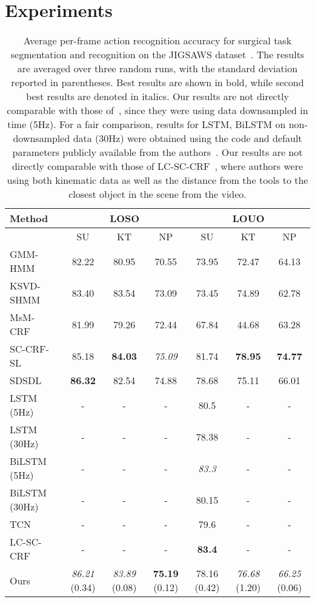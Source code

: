 \documentclass[10pt,twocolumn,letterpaper]{article}
\begin{document}
\section{Experiments}
\begin{table*}[ht!]
\setlength{\tabcolsep}{0.75mm}
\centering
\begin{tabular}{|@{\;}l@{\;}|ccc|ccc|}
\hline
Method & \multicolumn{3}{|c|}{LOSO} & \multicolumn{3}{|c|}{LOUO} \\
\hline
 & SU & KT & NP & SU & KT & NP\\
\hline
GMM-HMM~\cite{Ahmidi:TBME17}  &82.22  & 80.95  & 70.55 &  73.95  & 72.47  & 64.13 \\
KSVD-SHMM~\cite{Tao:IPCAI12,Ahmidi:TBME17} & 83.40 & 83.54  & 73.09  & 73.45  & 74.89   & 62.78  \\
MsM-CRF~\cite{Tao:MICCAI13,Ahmidi:TBME17} & 81.99  & 79.26  & 72.44  & 67.84   & 44.68  & 63.28 \\
SC-CRF-SL~\cite{Lea:WACV15,Ahmidi:TBME17} & 85.18 & \textbf{84.03} & \emph{75.09} & 81.74 & \textbf{78.95} & \textbf{74.77} \\
SDSDL~\cite{Sefati:M2CAI15} & \textbf{86.32} & 82.54 & 74.88 & 78.68 & 75.11 & 66.01 \\
LSTM (5Hz)~\cite{Dipietro:MICCAI16}\text{*} & -      & -     & -      & 
80.5 & -      & - \\
LSTM (30Hz)~\cite{Dipietro:MICCAI16}\text{*} & -      & -     & -      & 
78.38 & -      & - \\
BiLSTM (5Hz)~\cite{Dipietro:MICCAI16}\text{*} & -      & -     & -      & 
\emph{83.3} & -      & - \\
BiLSTM (30Hz) ~\cite{Dipietro:MICCAI16}\text{*} & -      & -     & -      & 
80.15 & -      & - \\
TCN~\cite{Lea:ECCV16-WBNIMR} & -      & -     & -      & 
79.6 & -      & - \\
LC-SC-CRF~\cite{Lea:ICRA16}\text{**} & -      & -     & -      & 
\textbf{83.4} & -      & - \\
Ours & \emph{86.21} (0.34) & \emph{83.89} (0.08) & \textbf{75.19} (0.12) & 78.16 (0.42) &\emph{76.68} (1.20) & \emph{66.25} (0.06)\\
\hline
\end{tabular}
\caption{Average per-frame action recognition accuracy for surgical task segmentation and recognition on the JIGSAWS dataset~\cite{Gao2014}. The results are averaged over three random runs, with the standard deviation reported in parentheses. Best results are shown in bold, while second best results are denoted in italics.\text{*} Our results are not directly comparable with those of~\cite{Dipietro:MICCAI16}, since they were using data downsampled in time (5Hz). For a fair comparison, results for LSTM, BiLSTM on non-downsampled data (30Hz) were obtained using the code and default parameters publicly available from the authors~\cite{Dipietro:MICCAI16}. \text{**} Our results are not directly comparable with those of LC-SC-CRF~\cite{Lea:ICRA16}, where authors were using both kinematic data as well as the distance from the tools to the closest object in the scene from the video. }
\vspace{-1em}
\label{tab:jigsaws_soa}
\end{table*}
\end{document}

